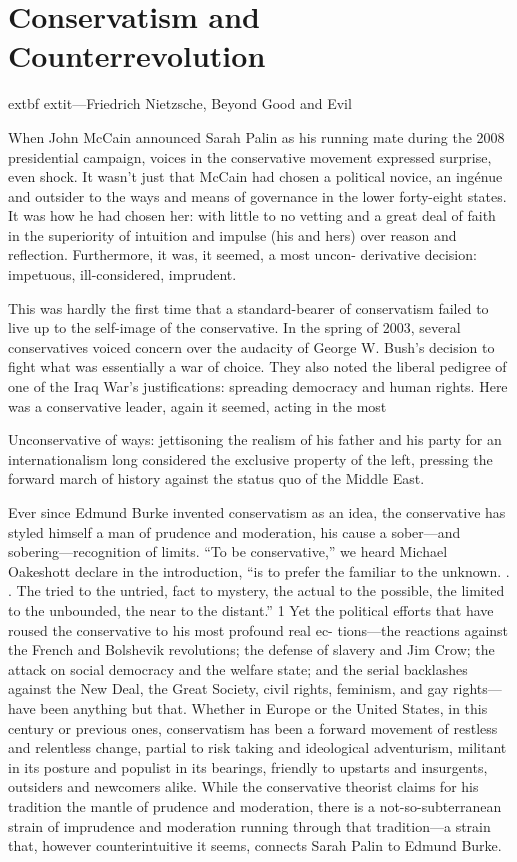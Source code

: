 \chapter{Conservatism and Counterrevolution}\label{Conservatism and Counterrevolution}
 \par 
	extbf{	extit{—Friedrich Nietzsche, Beyond Good and Evil} }
 \par 
When John McCain announced Sarah Palin as his running mate during the 2008 presidential campaign, voices in the conservative movement expressed surprise, even shock. It wasn’t just that McCain had chosen a political novice, an ingénue and outsider to the ways and means of governance in the lower forty-eight states. It was how he had chosen her: with little to no vetting and a great deal of faith in the superiority of intuition and impulse (his and hers) over reason and reflection. Furthermore, it was, it seemed, a most uncon- derivative decision: impetuous, ill-considered, imprudent.
 \par 
This was hardly the first time that a standard-bearer of conservatism failed to live up to the self-image of the conservative. In the spring of 2003, several conservatives voiced concern over the audacity of George W. Bush’s decision to fight what was essentially a war of choice. They also noted the liberal pedigree of one of the Iraq War’s justifications: spreading democracy and human rights. Here was a conservative leader, again it seemed, acting in the most
 \par 
Unconservative of ways: jettisoning the realism of his father and his party for an internationalism long considered the exclusive property of the left, pressing the forward march of history against the status quo of the Middle East.
 \par 
Ever since Edmund Burke invented conservatism as an idea, the conservative has styled himself a man of prudence and moderation, his cause a sober—and sobering—recognition of limits. “To be conservative,” we heard Michael Oakeshott declare in the introduction, “is to prefer the familiar to the unknown. . . The tried to the untried, fact to mystery, the actual to the possible, the limited to the unbounded, the near to the distant.” 1 Yet the political efforts that have roused the conservative to his most profound real ec- tions—the reactions against the French and Bolshevik revolutions; the defense of slavery and Jim Crow; the attack on social democracy and the welfare state; and the serial backlashes against the New Deal, the Great Society, civil rights, feminism, and gay rights— have been anything but that. Whether in Europe or the United States, in this century or previous ones, conservatism has been a forward movement of restless and relentless change, partial to risk taking and ideological adventurism, militant in its posture and populist in its bearings, friendly to upstarts and insurgents, outsiders and newcomers alike. While the conservative theorist claims for his tradition the mantle of prudence and moderation, there is a not-so-subterranean strain of imprudence and moderation running through that tradition—a strain that, however counterintuitive it seems, connects Sarah Palin to Edmund Burke.
